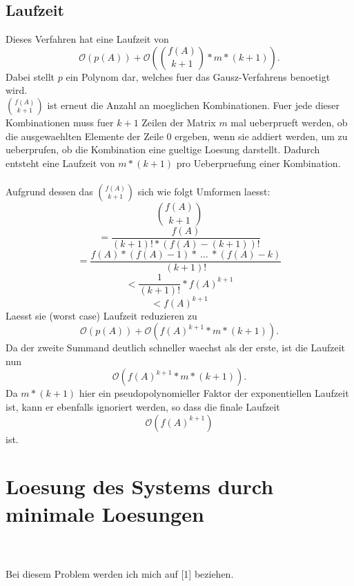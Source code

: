 \documentclass[a4paper,10pt,ngerman]{scrartcl}
\begin{document}
\subsection{Laufzeit}
Dieses Verfahren hat eine Laufzeit von 
$$
\mathcal{O}(p(A)) + \mathcal{O}( \binom{f(A)}{k+1} * m * (k+1) ). 
$$
Dabei stellt $p$ ein Polynom dar, welches fuer das Gausz-Verfahrens benoetigt wird.\\
${f(A)}\choose{k+1}$ ist erneut die Anzahl an moeglichen Kombinationen. Fuer jede dieser Kombinationen muss fuer $k+1$ Zeilen der Matrix $m$ mal ueberprueft werden, ob die ausgewaehlten Elemente der Zeile $0$ ergeben, wenn sie addiert werden, um zu ueberprufen, ob die Kombination eine gueltige Loesung darstellt. Dadurch entsteht eine Laufzeit von $m*(k+1)$ pro Ueberpruefung einer Kombination.
\\\\
Aufgrund dessen das ${f(A)}\choose{k+1}$ sich wie folgt Umformen laesst:
$$ {f(A)}\choose{k+1} $$
$$ = \frac{f(A)}{(k+1)!*(f(A) - (k+1))!} $$
$$ = \frac{f(A) * (f(A) - 1) * \ \dots \ * (f(A) - k) }{(k+1)!} $$
$$ < \frac{1}{(k+1)!} * f(A)^{k+1}  $$
$$ < f(A)^{k+1}  $$
Laesst sie (worst case) Laufzeit reduzieren zu 
$$
\mathcal{O}(p(A)) + \mathcal{O}(f(A)^{k+1} * m * (k+1) ).
$$
Da der zweite Summand deutlich schneller waechst als der erste, ist die Laufzeit nun
$$
\mathcal{O}(f(A)^{k+1} * m * (k+1) ).
$$
Da $m * (k+1)$ hier ein pseudopolynomieller Faktor der exponentiellen Laufzeit ist, kann er ebenfalls ignoriert werden, so dass die finale Laufzeit
$$
\mathcal{O}(f(A)^{k+1})
$$
ist.

\section{Loesung des Systems durch minimale Loesungen}
\\\\
Bei diesem Problem werden ich mich auf [1] beziehen.\\
\end{document}
